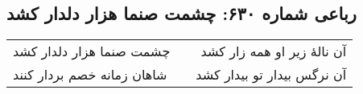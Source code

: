 \begin{center}
\section*{رباعی شماره ۶۳۰: چشمت صنما هزار دلدار کشد}
\label{sec:0630}
\begin{longtable}{l p{0.5cm} r}
چشمت صنما هزار دلدار کشد
&&
آن نالهٔ زیر او همه زار کشد
\\
شاهان زمانه خصم بردار کنند
&&
آن نرگس بیدار تو بیدار کشد
\\
\end{longtable}
\end{center}

